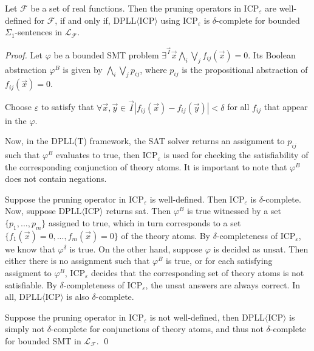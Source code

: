 \documentclass[envcountsect]{llncs}
\begin{document}
\begin{corollary}
Let $\mathcal{F}$ be a set of real functions. Then the pruning operators in ICP$_{\varepsilon}$ are well-defined for $\mathcal{F}$, if and only if, DPLL$\langle$ICP$\rangle$ using ICP$_{\varepsilon}$ is $\delta$-complete for bounded $\Sigma_1$-sentences in $\mathcal{L}_{\mathcal{F}}$.
\end{corollary}

\begin{proof}
Let $\varphi$ be a bounded SMT problem $\exists^{\vec I}\vec x \bigwedge_i\bigvee_j f_{ij}(\vec x)=0.$
Its Boolean abstraction $\varphi^B$ is given by $\bigwedge_i\bigvee_j p_{ij}$, where $p_{ij}$ is the propositional abstraction of $f_{ij}(\vec x)=0$. 

Choose $\varepsilon$ to satisfy that $\forall \vec x, \vec y\in \vec I |f_{ij}(\vec x)-f_{ij}(\vec y)|<\delta$ for all $f_{ij}$ that appear in the $\varphi$.

Now, in the DPLL(T) framework, the SAT solver returns an assignment to $p_{ij}$ such that $\varphi^B$ evaluates to true, then ICP$_{\varepsilon}$ is used for checking the satisfiability of the corresponding conjunction of theory atoms. It is important to note that $\varphi^B$ does not contain negations. 

Suppose the pruning operator in ICP$_{\varepsilon}$ is well-defined. Then ICP$_{\varepsilon}$ is $\delta$-complete. Now, suppose DPLL$\langle$ICP$\rangle$ returns {\sf sat}. Then $\varphi^B$ is true witnessed by a set $\{p_1,...,p_m\}$ assigned to true, which in turn corresponds to a set $\{f_1(\vec x)=0,...,f_m(\vec x)=0\}$ of the theory atoms. By $\delta$-completeness of ICP$_{\varepsilon}$, we know that $\varphi^{\delta}$ is true. On the other hand, suppose $\varphi$ is decided as {\sf unsat}. Then either there is no assignment such that $\varphi^B$ is true, or for each satisfying assigment to $\varphi^B$, ICP$_{\varepsilon}$ decides that the corresponding set of theory atoms is not satisfiable. By $\delta$-completeness of ICP$_{\varepsilon}$, the {\sf unsat} answers are always correct. In all, DPLL$\langle$ICP$\rangle$ is also $\delta$-complete. 

Suppose the pruning operator in ICP$_{\varepsilon}$ is not well-defined, then DPLL$\langle$ICP$\rangle$ is simply not $\delta$-complete for conjunctions of theory atoms, and thus not $\delta$-complete for bounded SMT in $\mathcal{L}_{\mathcal{F}}$. 
\qed\end{proof}
\end{document}
